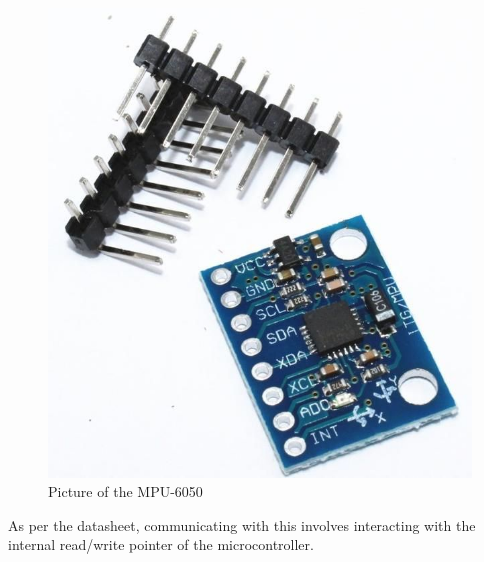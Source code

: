 \documentclass{article}
\begin{document}
        \begin{figure}[ht]
            \centering
            \includegraphics[scale = 0.25]{img/imu_breakout.jpg}
            \caption{Picture of the MPU-6050}
        \end{figure}
        
        As per the datasheet, communicating with this involves interacting with the internal read/write pointer of the microcontroller. \\
        
\end{document}

